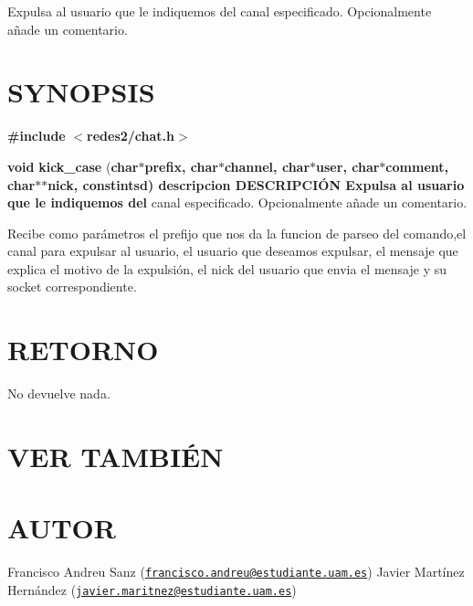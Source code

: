 Expulsa al usuario que le indiquemos del canal especificado. Opcionalmente añade un comentario.\hypertarget{unknown_case_SYNOPSIS}{}\section{S\-Y\-N\-O\-P\-S\-I\-S}\label{unknown_case_SYNOPSIS}
{\bfseries \#include} {\bfseries $<$redes2/chat.\-h$>$} 

{\bfseries void} {\bfseries kick\-\_\-case} {\bfseries }({\bfseries char{\bfseries $\ast${\bfseries prefix{\bfseries },} {\bfseries char{\bfseries $\ast${\bfseries channel{\bfseries },} {\bfseries char{\bfseries $\ast${\bfseries user{\bfseries },} {\bfseries char{\bfseries $\ast${\bfseries comment{\bfseries },} {\bfseries char{\bfseries $\ast$$\ast${\bfseries nick{\bfseries },} const{\bfseries int{\bfseries sd{\bfseries })}  } } descripcion} D\-E\-S\-C\-R\-I\-P\-C\-IÓ\-N}  Expulsa} al} usuario} que} le} indiquemos} del} canal especificado. Opcionalmente añade un comentario.

Recibe como parámetros el prefijo que nos da la funcion de parseo del comando,el canal para expulsar al usuario, el usuario que deseamos expulsar, el mensaje que explica el motivo de la expulsión, el nick del usuario que envia el mensaje y su socket correspondiente.\hypertarget{unknown_case_retorno}{}\section{R\-E\-T\-O\-R\-N\-O}\label{unknown_case_retorno}
No devuelve nada.\hypertarget{unknown_case_seealso}{}\section{V\-E\-R T\-A\-M\-B\-IÉ\-N}\label{unknown_case_seealso}
{\bfseries } \hypertarget{unknown_case_authors}{}\section{A\-U\-T\-O\-R}\label{unknown_case_authors}
Francisco Andreu Sanz (\href{mailto:francisco.andreu@estudiante.uam.es}{\tt francisco.\-andreu@estudiante.\-uam.\-es}) Javier Martínez Hernández (\href{mailto:javier.maritnez@estudiante.uam.es}{\tt javier.\-maritnez@estudiante.\-uam.\-es}) 